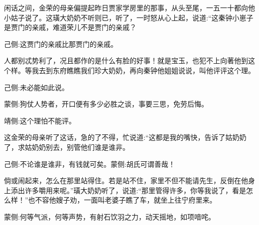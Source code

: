 \begin{parag}
    闲话之间，金荣的母亲偏提起昨日贾家学房里的那事，从头至尾，一五一十都向他小姑子说了。这璜大奶奶不听则已，听了，一时怒从心上起，说道:“这秦钟小崽子是贾门的亲戚，难道荣儿不是贾门的亲戚？\begin{note}己侧:这贾门的亲戚比那贾门的亲戚。\end{note}人都别忒势利了，况且都作的是什么有脸的好事！就是宝玉，也犯不上向著他到这个样。等我去到东府瞧瞧我们珍大奶奶，再向秦钟他姐姐说说，叫他评评这个理。\begin{note}己侧:未必能如此说。\end{note}\begin{note}蒙侧:狗仗人势者，开口便有多少必胜之谈，事要三思，免劳后悔。\end{note}\begin{note}靖侧:这个理怕不能评。\end{note}这金荣的母亲听了这话，急的了不得，忙说道:“这都是我的嘴快，告诉了姑奶奶了，求姑奶奶别去，别管他们谁是谁非。\begin{note}己侧:不论谁是谁非，有钱就可矣。蒙侧:胡氏可谓善哉！\end{note}倘或闹起来，怎么在那里站得住。若是站不住，家里不但不能请先生，反倒在他身上添出许多嚼用来呢。”璜大奶奶听了，说道:“那里管得许多，你等我说了，看是怎么样！”也不容他嫂子劝，一面叫老婆子瞧了车，就坐上往宁府里来。\begin{note}蒙侧:何等气派，何等声势，有射石饮羽之力，动天摇地，如项喑咤。\end{note}
\end{parag}


